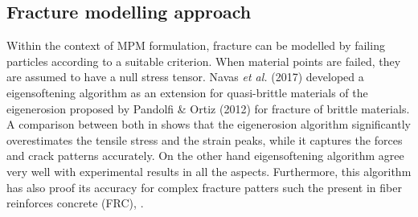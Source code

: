 \message{ !name(2020_EFM_MPM_Eigensoftening.tex)}\documentclass[preprint,12pt,a4paper]{elsarticle}
\begin{document}
\subsection{Fracture modelling approach}
\label{sec:2.3}
Within the context of MPM formulation, fracture can be modelled by
failing particles according to a suitable criterion. When material
points are failed, they are assumed to have a null stress
tensor. Navas {\it et al.} (2017)\cite{Navas_2017_ES} developed a
eigensoftening algorithm as an extension for quasi-brittle materials
of the eigenerosion proposed by Pandolfi \& Ortiz
(2012)\cite{Pandolfi_2012} for fracture of brittle materials. A
comparison between both in \cite{Navas_2017_ES} shows that
the eigenerosion algorithm significantly overestimates the tensile
stress and the strain peaks, while it captures the forces and crack
patterns accurately. On the other hand eigensoftening algorithm agree
very well with experimental results in all the aspects. Furthermore,
this algorithm has also proof its accuracy for complex fracture
patters such the present in fiber reinforces concrete (FRC),
\cite{Navas_2018_ES}.\\
\end{document}
